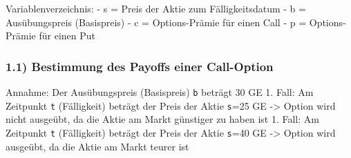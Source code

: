 \documentclass[paper=landscape]{scrartcl}
\begin{document}
Variablenverzeichnis: - s = Preis der Aktie zum Fälligkeitsdatum - b =
Ausübungspreis (Basispreis) - c = Options-Prämie für einen Call - p =
Options-Prämie für einen Put

\hypertarget{bestimmung-des-payoffs-einer-call-option}{%
\subsubsection{1.1) Bestimmung des Payoffs einer
Call-Option}\label{bestimmung-des-payoffs-einer-call-option}}

Annahme: Der Ausübungspreis (Basispreis) \texttt{b} beträgt 30 GE 1.
Fall: Am Zeitpunkt \texttt{t} (Fälligkeit) beträgt der Preis der Aktie
\texttt{s}=25 GE -\textgreater{} Option wird nicht ausgeübt, da die
Aktie am Markt günstiger zu haben ist 1. Fall: Am Zeitpunkt \texttt{t}
(Fälligkeit) beträgt der Preis der Aktie \texttt{s}=40 GE
-\textgreater{} Option wird ausgeübt, da die Aktie am Markt teurer ist
\end{document}

